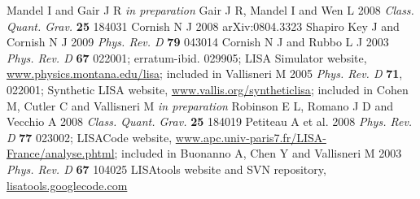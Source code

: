 \documentclass{iopart}
\begin{document}
\begin{thebibliography}{99}
%
 Mandel I and Gair J R \textit{in preparation}
%
 Gair J R, Mandel I and Wen L 2008 \textit{Class. Quant. Grav.} \textbf{25} 184031
%
 Cornish N J 2008 arXiv:0804.3323
%
 Shapiro Key J and Cornish N J 2009 \textit{Phys. Rev. D} \textbf{79} 043014
%
 Cornish N J and Rubbo L J 2003 \textit{Phys. Rev. D} \textbf{67} 022001; erratum-ibid. 029905; LISA Simulator website, \url{www.physics.montana.edu/lisa}; included in \cite{lisatools}
%
 Vallisneri M 2005 \textit{Phys. Rev. D} \textbf{71}, 022001; Synthetic LISA website, \url{www.vallis.org/syntheticlisa}; included in \cite{lisatools}
%
 Cohen M, Cutler C and Vallisneri M \textit{in preparation}
%
 Robinson E L, Romano J D and Vecchio A 2008 \textit{Class. Quant. Grav.} \textbf{25} 184019 
%
 Petiteau A et al. 2008 \textit{Phys. Rev. D} \textbf{77} 023002; LISACode website, \url{www.apc.univ-paris7.fr/LISA-France/analyse.phtml}; included in \cite{lisatools}
%
 Buonanno A, Chen Y and Vallisneri M 2003 \textit{Phys. Rev. D} \textbf{67} 104025
%
 LISAtools website and SVN repository, \url{lisatools.googlecode.com}

\end{thebibliography}
\end{document}
